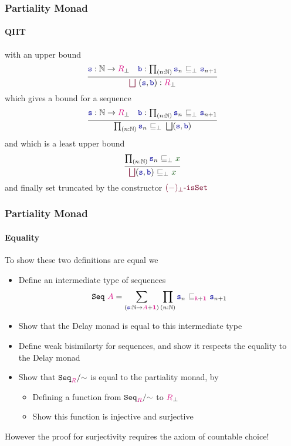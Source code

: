 \documentclass[xelatex,mathserif,serif,notheorems]{beamer} %
\theoremstyle{plain} %
\theoremstyle{definition}
\theoremstyle{remark}
\newcommand*{\term}[1]{\textcolor{green!30!black}{#1}} %
\newcommand*{\type}[1]{\textcolor{magenta!90!black}{#1}}
\newcommand*{\unit}{\type{\textbf{1}}}
\newcommand*{\relation}[1]{\textcolor{gray!75!black}{\ensuremath{\mathtt{#1}}}}
\newcommand*{\function}[1]{\textcolor{blue!60!black}{\ensuremath{\mathtt{#1}}}}
\newcommand*{\constructor}[1]{\textcolor{purple!60!black}{\ensuremath{\mathtt{#1}}}}
\newcommand*{\typeformer}[1]{\ensuremath{\mathtt{#1}}}
\begin{document}
\begin{frame}
  \frametitle{Partiality Monad}
  \framesubtitle{QIIT}
  with an upper bound
  \begin{equation}
    \vcenter{\infer{\constructor{\bigsqcup}~(\function{s},\function{b}) : \type{R}_\bot}{\function{s} : \mathbb{N} \rightarrow \type{R}_\bot & \function{b} : \prod_{(n : \mathbb{N})} \function{s}_n~\relation{\sqsubseteq_{\bot}}~\function{s}_{n+1} }}
  \end{equation}
  which gives a bound for a sequence
  \begin{equation}
    \vcenter{\infer{\prod_{(n : \mathbb{N})} \function{s}_n~\relation{\sqsubseteq_{\bot}}~\bigsqcup(\function{s},\function{b})}{\function{s} : \mathbb{N} \rightarrow \type{R}_\bot & \function{b} : \prod_{(n : \mathbb{N})} \function{s}_n~\relation{\sqsubseteq_{\bot}}~\function{s}_{n+1} }}
  \end{equation}
  and which is a least upper bound
  \begin{equation}
    \vcenter{\infer{\constructor{\bigsqcup}(\function{s},\function{b})~\relation{\sqsubseteq_{\bot}}~\term{x}}{\prod_{(n:\mathbb{N})} \function{s}_n~\relation{\sqsubseteq_{\bot}}~\term{x}}}
  \end{equation}
  and finally set truncated by the constructor \(\constructor{(-)_\bot\text{-}isSet}\)
\end{frame}

\begin{frame}
  \frametitle{Partiality Monad}
  \framesubtitle{Equality}
  To show these two definitions are equal we
  \begin{itemize}
  \item Define an intermediate type of sequences
    \begin{equation}
      \typeformer{Seq}~\type{A} = \sum_{(\function{s} : \mathbb{N} \rightarrow \type{A} + \unit)}  \prod_{(n : \mathbb{N})} \function{s}_n~\relation{\sqsubseteq_{\type{R} + \unit}}~\function{s}_{n+1}
    \end{equation}
  \item Show that the Delay monad is equal to this intermediate type
  \item Define weak bisimilarty for sequences, and show it respects the equality to the Delay monad
  \item Show that \(\typeformer{Seq}_{\type{R}}/\relation{\sim}\) is equal to the partiality monad, by
    \begin{itemize}
    \item Defining a function from \(\typeformer{Seq}_{\type{R}}/\relation{\sim}\) to \(\type{R}_{\bot}\)
    \item Show this function is injective and surjective
    \end{itemize}
  \end{itemize}
  However the proof for surjectivity requires the axiom of countable choice!
\end{frame}
\end{document}

